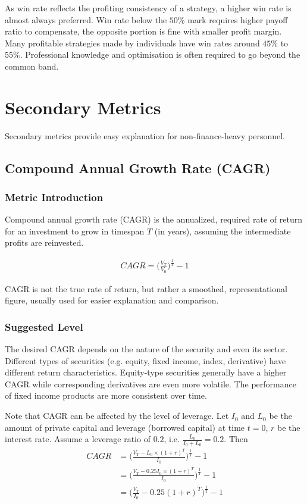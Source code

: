 \documentclass[12pt]{article}
\begin{document}
As win rate reflects the profiting consistency of a strategy, a higher win rate is almost always preferred. Win rate below the $50\%$ mark requires higher payoff ratio to compensate, the opposite portion is fine with smaller profit margin. Many profitable strategies made by individuals have win rates around $45\%$ to $55\%$. Professional knowledge and optimisation is often required to go beyond the common band.

\section{Secondary Metrics}

Secondary metrics provide easy explanation for non-finance-heavy personnel.

\subsection{Compound Annual Growth Rate (CAGR)}

\subsubsection*{Metric Introduction}

Compound annual growth rate (CAGR) is the annualized, required rate of return for an investment to grow in timespan \(T\) (in years), assuming the intermediate profits are reinvested.

\begin{align*}
  CAGR = \bigg(\frac{V_T}{V_0} \bigg)^{\frac{1}{T}}-1
\end{align*}

CAGR is not the true rate of return, but rather a smoothed, representational figure, usually used for easier explanation and comparison.

\subsubsection*{Suggested Level}

The desired CAGR depends on the nature of the security and even its sector. Different types of securities (e.g. equity, fixed income, index, derivative) have different return characteristics. Equity-type securities generally have a higher CAGR while corresponding derivatives are even more volatile. The performance of fixed income products are more consistent over time.

Note that CAGR can be affected by the level of leverage. Let $I_0$ and $L_0$ be the amount of private capital and leverage (borrowed capital) at time $t=0$, $r$ be the interest rate. Assume a leverage ratio of $0.2$, i.e. $\frac{L_0}{I_0+L_0} = 0.2$. Then
\begin{align*}
  CAGR &= \bigg(\frac{V_T-L_0\times (1+r)^T}{I_0} \bigg)^{\frac{1}{T}}-1 \\
       &= \bigg(\frac{V_T-0.25I_0\times (1+r)^T}{I_0} \bigg)^{\frac{1}{T}}-1 \\
       &= \bigg(\frac{V_T}{I_0}-0.25(1+r)^T \bigg)^{\frac{1}{T}}-1
\end{align*}
\end{document}
